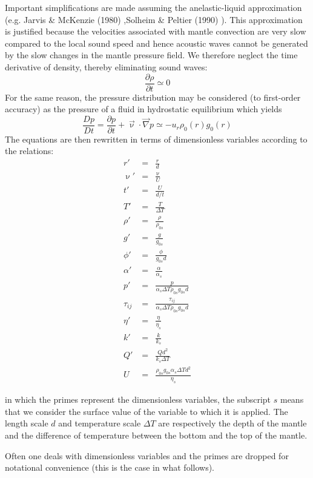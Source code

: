 Important simplifications are made assuming the anelastic-liquid approximation 
(e.g. \cite{jamc80} Jarvis \& McKenzie (1980) \cite{jamc80},Solheim \& Peltier (1990) \cite{sope90}).
This approximation is justified because the velocities associated with mantle convection 
are very slow compared to the local sound speed and
hence acoustic waves cannot be generated by the slow changes in the mantle pressure field. 
We therefore neglect the time derivative of density, thereby eliminating sound waves:
\[
\frac{\partial \rho}{\partial t} \simeq 0
\] 
For the same reason, the pressure distribution may be considered (to first-order accuracy) 
as the pressure of a fluid in hydrostatic equilibrium which yields
\[
\frac{Dp}{Dt} = \frac{\partial p}{\partial t} + \vec\upnu\cdot\vec\nabla p 
\simeq
- u_r \rho_0(r) g_0(r)
\]
The equations are then rewritten in terms of dimensionless variables according to the relations:
\begin{eqnarray}
r'&=&\frac{r}{d} \\
\upnu' &=& \frac{\upnu}{U} \\
t' &=& \frac{U}{d/t} \\
T' &=& \frac{T}{\Delta T} \\
\rho' &=& \frac{\rho}{\rho_{0s}} \\
g' &=& \frac{g}{g_{0s}} \\
\phi' &=& \frac{\phi}{g_{0s}d} \\
\alpha' &=& \frac{\alpha}{\alpha_s} \\
p' &=& \frac{p}{\alpha_s \Delta T \rho_{0s} g_{0s} d} \\
\tau_{ij} &=& \frac{\tau_{ij}}{\alpha_s \Delta T \rho_{0s} g_{0s} d} \\
\eta' &=& \frac{\eta}{\eta_s} \\
k' &=& \frac{k}{k_s} \\
Q' &=& \frac{Q d^2}{k_s \Delta T} \\
U &=& \frac{\rho_{0s}g_{0s}\alpha_s \Delta T d^2}{\eta_s}
\end{eqnarray}

in which the primes represent the dimensionless variables, the subscript $s$ means 
that we consider the surface value of the variable to which it
is applied. The length scale $d$ and temperature scale $\Delta T$ are respectively 
the depth of the mantle and the difference of temperature between
the bottom and the top of the mantle. 

Often one deals with dimensionless variables and the primes
are dropped for notational convenience (this is the case in what follows).

